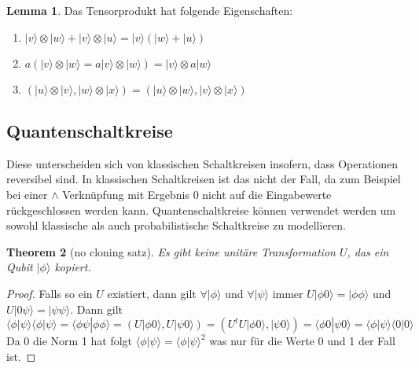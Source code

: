 \documentclass[a4paper, 12pt]{article}
\theoremstyle{plain}
\newtheorem{theorem}{Theorem}[section] %
\theoremstyle{definition}
\theoremstyle{lemma}
\newtheorem{lemma}[theorem]{Lemma}
\theoremstyle{remark}
\theoremstyle{example}
\begin{document}
	\begin{lemma}
		Das Tensorprodukt hat folgende Eigenschaften:
		\begin{enumerate}
			\item $|v\rangle \otimes |w\rangle + |v\rangle \otimes |u\rangle = |v\rangle (|w\rangle + |u\rangle)$
			\item $a(|v\rangle \otimes |w\rangle = a|v\rangle \otimes |w\rangle) = |v\rangle \otimes a|w\rangle$
			\item $(|u\rangle \otimes |v\rangle , |w\rangle \otimes |x\rangle) = (|u\rangle\otimes|w\rangle , |v\rangle\otimes|x\rangle)$
		\end{enumerate}
	\end{lemma}
	
	\subsection{Quantenschaltkreise}
	Diese unterscheiden sich von klassischen Schaltkreisen insofern, dass Operationen reversibel sind. In klassischen Schaltkreisen ist das nicht der Fall, da zum Beispiel bei einer $\land$ Verknüpfung mit Ergebnis 0 nicht auf die Eingabewerte rückgeschlossen werden kann. Quantenschaltkreise können verwendet werden um sowohl klassische als auch probabilistische Schaltkreise zu modellieren.
	\begin{theorem} [no cloning satz]
		Es gibt keine unitäre Transformation $U$, das ein Qubit $|\phi\rangle$ kopiert.
	\end{theorem}
	\begin{proof}
		Falls so ein $U$ existiert, dann gilt $\forall |\phi\rangle$ und $\forall |\psi\rangle$ immer $U|\phi 0 \rangle = |\phi\phi\rangle$ und $U|0\psi\rangle = |\psi\psi\rangle$. Dann gilt \[\langle\phi|\psi\rangle\langle\phi|\psi\rangle = \langle\phi\psi|\phi\phi\rangle = (U|\phi0\rangle, U|\psi0\rangle) = (U^tU|\phi0\rangle, |\psi0\rangle) = \langle\phi0|\psi0\rangle = \langle\phi|\psi\rangle\langle0|0\rangle\] Da 0 die Norm 1 hat folgt $\langle\phi|\psi\rangle = \langle\phi|\psi\rangle^2$ was nur für die Werte 0 und 1 der Fall ist.
	\end{proof}
\end{document}
